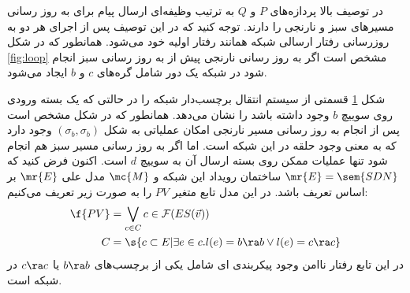 در توصیف بالا پردازه‌های
$P$
و
$Q$
به ترتیب وظیفه‌ای ارسال پیام برای به روز رسانی مسیر‌های سبز و نارنجی را دارند.
توجه کنید که در این توصیف پس از اجرای هر دو به روزرسانی رفتار ارسالی شبکه همانند رفتار اولیه خود می‌شود.
همانطور که در شکل
\ref{fig:loop}
مشخص است اگر به روز رسانی نارنجی پیش از به روز رسانی سبز انجام شود در شبکه یک دور شامل گره‌های
$c$
و
$b$
ایجاد می‌شود.
\begin{figure}
    \centering
    \caption{}
    \label{fig:loop:lts}
\end{figure}
شکل
\ref{fig:loop:lts}
قسمتی از سیستم انتقال برچسب‌دار شبکه را در حالتی که یک بسته ورودی روی سوییچ 
$b$
وجود داشته باشد را نشان می‌دهد.
همانطور که در شکل مشخص است پس از انجام به روز رسانی مسیر نارنجی امکان عملیاتی به شکل 
$(\sigma_b,\sigma_b)$
وجود دارد که به معنی وجود حلقه در این شبکه است. 
اما اگر به روز رسانی مسیر سبز هم انجام شود تنها عملیات ممکن روی بسته ارسال آن به سوییچ 
$d$
است.
اکنون فرض کنید که
$\mr{E} = \sem{SDN}$
ساختمان رویداد این شبکه و
$\mc{M}$
مدل علی
$\mr{E}$
بر اساس تعریف
باشد.
در این مدل تابع متغیر
$PV$
را به صورت زیر تعریف می‌کنیم:
\begin{align*}
    \f{PV} & = \bigvee_{c \in C} c \in \mathcal{F}(ES(\vec v)) \\
    C      & = \s{c \subset E | \exists e \in c.
        l(e) = b\ra b \vee l(e) = c\ra c }
\end{align*}
در این تابع رفتار ناامن وجود پیکربندی ای شامل یکی از برچسب‌های
$b \ra b$
یا
$c \ra c$
در شبکه است.
